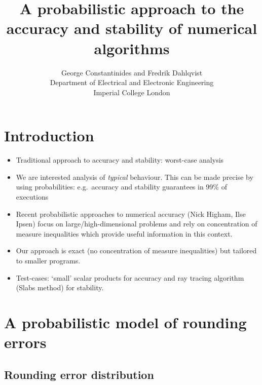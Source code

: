 \documentclass[10pt,conference]{IEEEtran}
\title{A probabilistic approach to the accuracy and stability of numerical algorithms}
\author{George Constantinides and Fredrik Dahlqvist \\ Department of Electrical and Electronic Engineering\\ Imperial College London}
\newcommand{\eg}{e.g.\ }
\begin{document}
\maketitle

\begin{abstract}

\end{abstract}

\section{Introduction}
\begin{itemize}
\item Traditional approach to accuracy and stability: worst-case analysis
\item We are interested analysis of \emph{typical} behaviour. This can be made precise by using probabilities: \eg accuracy and stability guarantees in 99\% of executions
\item Recent probabilistic approaches to numerical accuracy (Nick Higham, Ilse Ipsen) focus on large/high-dimensional problems and rely on concentration of measure inequalities which provide useful information in this context.
\item Our approach is exact (no concentration of measure inequalities) but tailored to smaller programs. 
\item Test-cases: `small' scalar products for accuracy and ray tracing algorithm (Slabs method) for stability. 
\end{itemize} 

\section{A probabilistic model of rounding errors}

\subsection{Rounding error distribution}\label{subsec:error_dist}
\end{document}
